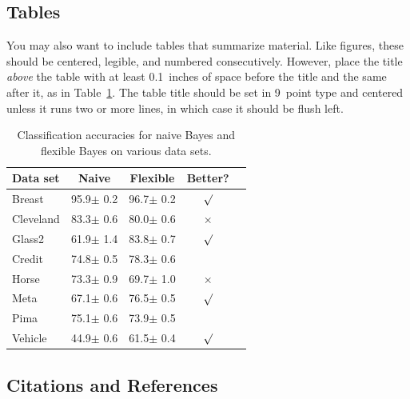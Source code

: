 \documentclass{article}
\begin{document}
\subsection{Tables} 
 
You may also want to include tables that summarize material. Like 
figures, these should be centered, legible, and numbered consecutively. 
However, place the title {\it above\/} the table with at least 
0.1~inches of space before the title and the same after it, as in 
Table~\ref{sample-table}. The table title should be set in 9~point 
type and centered unless it runs two or more lines, in which case it
should be flush left.


\begin{table}[t]
\caption{Classification accuracies for naive Bayes and flexible 
Bayes on various data sets.}
\label{sample-table}
\vskip 0.15in
\begin{center}
\begin{small}
\begin{sc}
\begin{tabular}{lcccr}
\hline
\abovespace\belowspace
Data set & Naive & Flexible & Better? \\
\hline
\abovespace
Breast    & 95.9$\pm$ 0.2& 96.7$\pm$ 0.2& $\surd$ \\
Cleveland & 83.3$\pm$ 0.6& 80.0$\pm$ 0.6& $\times$\\
Glass2    & 61.9$\pm$ 1.4& 83.8$\pm$ 0.7& $\surd$ \\
Credit    & 74.8$\pm$ 0.5& 78.3$\pm$ 0.6&         \\
Horse     & 73.3$\pm$ 0.9& 69.7$\pm$ 1.0& $\times$\\
Meta      & 67.1$\pm$ 0.6& 76.5$\pm$ 0.5& $\surd$ \\
Pima      & 75.1$\pm$ 0.6& 73.9$\pm$ 0.5&         \\
\belowspace
Vehicle   & 44.9$\pm$ 0.6& 61.5$\pm$ 0.4& $\surd$ \\
\hline
\end{tabular}
\end{sc}
\end{small}
\end{center}
\vskip -0.1in
\end{table}

\subsection{Citations and References} 
\end{document}
